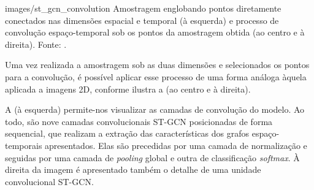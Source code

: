     {images/st_gcn_convolution}
    {Amostragem englobando pontos diretamente conectados nas dimensões espacial e temporal (à esquerda) e processo de convolução espaço-temporal sob os pontos da amostragem obtida (ao centro e à direita).  Fonte: \cite[p. 3]{st-gcn-2018}.}

Uma vez realizada a amostragem sob as duas dimensões e selecionados os pontos para a convolução, é possível aplicar esse processo de uma forma análoga àquela aplicada a imagens 2D, conforme ilustra a  (ao centro e à direita).



A  (à esquerda) permite-nos visualizar as camadas de convolução do modelo. Ao todo, são nove camadas convolucionais ST-GCN posicionadas de forma sequencial, que realizam a extração das características dos grafos espaço-temporais apresentados. Elas são precedidas por uma camada de normalização e seguidas por uma camada de \textit{pooling} global e outra de classificação \textit{softmax}. À direita da imagem é apresentado também o detalhe de uma unidade convolucional ST-GCN.

